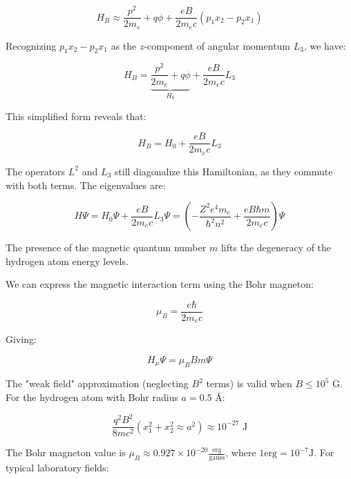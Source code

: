 \documentclass[italian]{HKNdocument}
\begin{document}
\begin{equation}
H_{B}\approx\frac{p^{2}}{2m_e}+q\phi+\frac{eB}{2m_e c}(p_{1}x_{2}-p_{2}x_{1}) \label{eq:12.14}
\end{equation}

Recognizing $p_{1}x_{2}-p_{2}x_{1}$ as the $z$-component of angular momentum $L_3$, we have:

\begin{equation}
H_{B}=\underbrace{\frac{p^{2}}{2m_e}+q\phi}_{H_0}+\frac{eB}{2m_e c}L_3 \label{eq:12.15}
\end{equation}

This simplified form reveals that:

\begin{equation}
H_{B}=H_0+\frac{eB}{2m_e c}L_3 \label{eq:12.16}
\end{equation}

The operators $L^2$ and $L_3$ still diagonalize this Hamiltonian, as they commute with both terms. The eigenvalues are:

\begin{equation}
H\Psi=H_0\Psi+\frac{eB}{2m_e c}L_3\Psi=\left(-\frac{Z^2e^4m_e}{\hbar^2n^2}+\frac{eB\hbar m}{2m_e c}\right)\Psi \label{eq:12.17}
\end{equation}

The presence of the magnetic quantum number $m$ lifts the degeneracy of the hydrogen atom energy levels.

We can express the magnetic interaction term using the Bohr magneton:

\begin{equation}
\mu_B=\frac{e\hbar}{2m_e c} \label{eq:12.18}
\end{equation}

Giving:

\begin{equation}
H_\mu\Psi=\mu_B Bm\Psi \label{eq:12.19}
\end{equation}

The "weak field" approximation (neglecting $B^2$ terms) is valid when $B\leq 10^5$ G. For the hydrogen atom with Bohr radius $a=0.5$ Å:

\begin{equation}
\frac{q^2B^2}{8mc^2}(x_1^2+x_2^2\approx a^2)\approx 10^{-27} \text{ J} \label{eq:12.20}
\end{equation}


The Bohr magneton value is $\mu_{B} \approx 0.927 \times 10^{-20} \frac{\text{erg}}{\text{gauss}}$, where $1 \text{erg}=10^{-7} \text{J}$. For typical laboratory fields:
\end{document}
